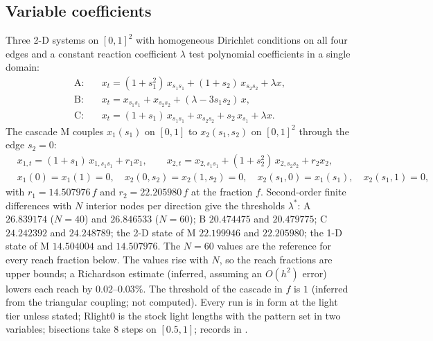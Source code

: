 \subsection{Variable coefficients}\label{sec:bl-inhom}

Three 2-D systems on $[0,1]^2$ with homogeneous Dirichlet conditions on all four edges and a constant reaction coefficient $\lambda$ test polynomial coefficients in a single domain:
\begin{align*}
\text{A:}\quad & x_t = (1+s_1^2)\,x_{s_1s_1} + (1+s_2)\,x_{s_2s_2} + \lambda x,\\
\text{B:}\quad & x_t = x_{s_1s_1} + x_{s_2s_2} + (\lambda - 3s_1s_2)\,x,\\
\text{C:}\quad & x_t = (1+s_1)\,x_{s_1s_1} + x_{s_2s_2} + s_2\,x_{s_1} + \lambda x.
\end{align*}
The cascade M couples $x_1(s_1)$ on $[0,1]$ to $x_2(s_1,s_2)$ on $[0,1]^2$ through the edge $s_2=0$:
\begin{align*}
& x_{1,t} = (1+s_1)\,x_{1,s_1s_1} + r_1 x_1, \qquad x_{2,t} = x_{2,s_1s_1} + (1+s_2^2)\,x_{2,s_2s_2} + r_2 x_2,\\
& x_1(0)=x_1(1)=0,\quad x_2(0,s_2)=x_2(1,s_2)=0,\quad x_2(s_1,0)=x_1(s_1),\quad x_2(s_1,1)=0,
\end{align*}
with $r_1 = 14.507976\,f$ and $r_2 = 22.205980\,f$ at the fraction $f$. Second-order finite differences with $N$ interior nodes per direction give the thresholds $\lambda^*$: A $26.839174$ ($N=40$) and $26.846533$ ($N=60$); B $20.474475$ and $20.479775$; C $24.242392$ and $24.248789$; the 2-D state of M $22.199946$ and $22.205980$; the 1-D state of M $14.504004$ and $14.507976$. The $N=60$ values are the reference for every reach fraction below. The values rise with $N$, so the reach fractions are upper bounds; a Richardson estimate (inferred, assuming an $O(h^2)$ error) lowers each reach by $0.02$--$0.03\%$. The threshold of the cascade in $f$ is $1$ (inferred from the triangular coupling; not computed). Every run is  in form  at the light tier unless stated; Rlight0 is the stock light lengths with the  pattern set in two variables; bisections take $8$ steps on $[0.5,1]$; records in .

